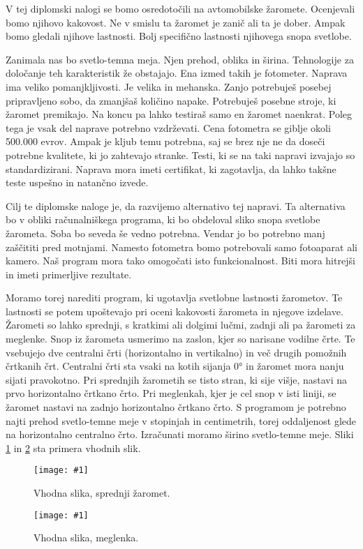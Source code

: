 \documentclass[oneside, a4paper, 12pt]{book}
\newcommand{\slika}[3]{
	\begin{figure}
	\begin{center}
	\texttt{[image: \#1]}
	\end{center}
	\vspace{-20pt}
	\caption{#2}
	\label{#3}
	\end{figure}
}
\begin{document}
V tej diplomski nalogi se bomo osredotočili na avtomobilske žaromete. Ocenjevali bomo njihovo kakovost. Ne v smislu ta žaromet je zanič ali ta je dober. Ampak bomo gledali njihove lastnosti. Bolj specifično lastnosti njihovega snopa svetlobe.

Zanimala nas bo svetlo-temna meja. Njen prehod, oblika in širina. Tehnologije za določanje teh karakteristik že obstajajo. Ena izmed takih je fotometer. Naprava ima veliko pomanjkljivosti. Je velika in mehanska. Zanjo potrebuješ posebej pripravljeno sobo, da zmanjšaš količino napake. Potrebuješ posebne stroje, ki žaromet premikajo. Na koncu pa lahko testiraš samo en žaromet naenkrat. Poleg tega je vsak del naprave potrebno vzdrževati. Cena fotometra se giblje okoli 500.000 evrov. Ampak je kljub temu potrebna, saj se brez nje ne da doseči potrebne kvalitete, ki jo zahtevajo stranke. Tes\-ti, ki se na taki napravi izvajajo so standardizirani. Naprava mora imeti certifikat, ki zagotavlja, da lahko takšne teste uspešno in natančno izvede.

Cilj te diplomske naloge je, da razvijemo alternativo tej napravi. Ta alternativa bo v obliki računalniškega programa, ki bo obdeloval sliko snopa svetlobe žarometa. Soba bo seveda še vedno potrebna. Vendar jo bo potrebno manj zaščititi pred motnjami. Namesto fotometra bomo potrebovali samo fotoaparat ali kamero. Naš program mora tako omogočati  isto funkcionalnost. Biti mora hitrejši in imeti primerljive rezultate.

Moramo torej narediti program, ki ugotavlja svetlobne lastnosti žarometov. Te lastnosti se potem upoštevajo pri oceni kakovosti žarometa in njegove izdelave. Žarometi so lahko sprednji, s kratkimi ali dolgimi lučmi, zadnji ali pa žarometi za meglenke. Snop iz žarometa usmerimo na zaslon, kjer so narisane vodilne črte. Te vsebujejo dve centralni črti (horizontalno in vertikalno) in več drugih pomožnih črtkanih črt. Centralni črti sta vsaki na kotih sijanja 0° in žaromet mora nanju sijati pravokotno. Pri sprednjih žarometih se tisto stran, ki sije višje, nastavi na prvo horizontalno črtkano črto. Pri meglenkah, kjer je cel snop v isti liniji, se žaromet nastavi na zadnjo horizontalno črtkano črto. S programom je potrebno najti prehod svetlo-temne meje v stopinjah in centimetrih, torej oddaljenost glede na horizontalno centralno črto. Izračunati moramo širino svetlo-temne meje. Sliki \ref{pic:vhp1} in \ref{pic:vhp2} sta primera vhodnih slik.

\slika{slike/original.jpg}{Vhodna slika, sprednji žaromet.}{pic:vhp1}
\slika{slike/levi3.JPG}{Vhodna slika, meglenka.}{pic:vhp2}
\end{document}
